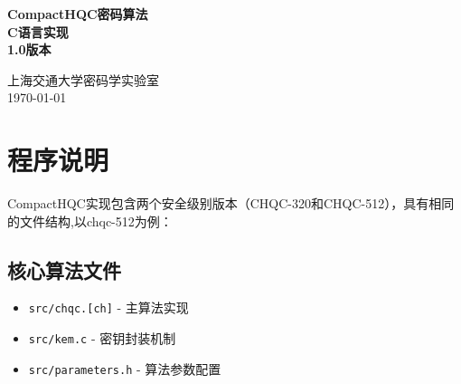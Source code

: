 \documentclass[zihao=-4,fontset=fandol,linespread=1.5]{ctexart}
\begin{document}
\thispagestyle{fancy} %
\fancyhf{} %
\fancyhead[L]{} %
\renewcommand{\headrulewidth}{0pt} %
\setlength{\headheight}{15pt}

\vspace*{\fill} %

\begin{center}
    \setlength{\lineskip}{1em} %
    { \songti \bfseries {CompactHQC密码算法\\ C语言实现 \\ 1.0版本} } %
\end{center}

\vspace*{\fill} %
\vspace*{\fill} %
\vspace*{\fill} %

\begin{center}
    { \heiti 上海交通大学密码学实验室} \\ %
    { \heiti \today} %
\end{center}

\renewcommand{\thepage}{---\arabic{page}---}

\newpage %

\setcounter{page}{1}

\tableofcontents
\newpage


\section{程序说明}

CompactHQC实现包含两个安全级别版本（CHQC-320和CHQC-512），具有相同的文件结构,以chqc-512为例：

\subsection{核心算法文件}
\begin{itemize}
    \item \texttt{src/chqc.[ch]} - 主算法实现
    \item \texttt{src/kem.c} - 密钥封装机制
    \item \texttt{src/parameters.h} - 算法参数配置
\end{itemize}
\end{document}
